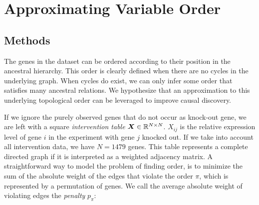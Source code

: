 \newpage
\section{Approximating Variable Order}
\label{chapter:methodorder}









\subsection{Methods}


The genes in the dataset can be ordered according to their position in the ancestral hierarchy. This order is clearly defined when there are no cycles in the underlying graph. When cycles do exist, we can only infer some order that satisfies many ancestral relations. We hypothesize that an approximation to this underlying topological order can be leveraged to improve causal discovery.

If we ignore the purely observed genes that do not occur as knock-out gene, we are left with a square \textit{intervention table} $\bm{X} \in \mathbb{R}^{N\times N}$. $X_{ij}$ is the relative expression level of gene $i$ in the experiment with gene $j$ knocked out. If we take into account all intervention data, we have $N=1479$ genes. This table represents a complete directed graph if it is interpreted as a weighted adjacency matrix. A straightforward way to model the problem of finding order, is to minimize the sum of the absolute weight of the edges that violate the order $\pi$, which is represented by a permutation of genes. We call the average absolute weight of violating edges the \textit{penalty} $p_\pi$:

